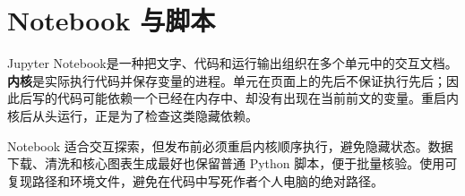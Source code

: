 \section{Notebook 与脚本}
Jupyter Notebook是一种把文字、代码和运行输出组织在多个单元中的交互文档。\textbf{内核}是实际执行代码并保存变量的进程。单元在页面上的先后不保证执行先后；因此后写的代码可能依赖一个已经在内存中、却没有出现在当前前文的变量。重启内核后从头运行，正是为了检查这类隐藏依赖。

Notebook 适合交互探索，但发布前必须重启内核顺序执行，避免隐藏状态。数据下载、清洗和核心图表生成最好也保留普通 Python 脚本，便于批量核验。使用可复现路径和环境文件，避免在代码中写死作者个人电脑的绝对路径。


